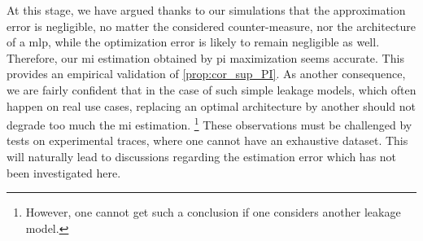 At this stage, we have argued thanks to our simulations that the approximation error is negligible, no matter the considered counter-measure, nor the architecture of a \gls{mlp}, while the optimization error is likely to remain negligible as well.
Therefore, our \gls{mi} estimation obtained by \gls{pi} maximization seems accurate. 
This provides an empirical validation of \autoref{prop:cor_sup_PI}.
As another consequence, we are fairly confident that in the case of such simple leakage models, which often happen on real use cases, replacing an optimal architecture by another should not degrade too much the \gls{mi} estimation.%
\footnote{However, one cannot get such a conclusion if one considers another leakage model.}
These observations must be challenged by tests on experimental traces, where one cannot have an exhaustive dataset. 
This will naturally lead to discussions regarding the estimation error which has not been investigated here.